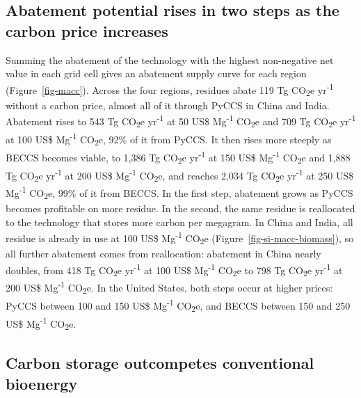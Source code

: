 \documentclass[
  letterpaper,
  twoside,
  twocolumn,
  9pt]{article}
\begin{document}
\subsection{Abatement potential rises in two steps as the carbon price
increases}\label{abatement-potential-rises-in-two-steps-as-the-carbon-price-increases}

Summing the abatement of the technology with the highest non-negative
net value in each grid cell gives an abatement supply curve for each
region (Figure~\ref{fig-macc}). Across the four regions, residues abate
119 Tg CO\textsubscript{2}e yr\textsuperscript{-1} without a carbon
price, almost all of it through PyCCS in China and India. Abatement
rises to 543 Tg CO\textsubscript{2}e yr\textsuperscript{-1} at 50 US\$
Mg\textsuperscript{-1} CO\textsubscript{2}e and 709 Tg
CO\textsubscript{2}e yr\textsuperscript{-1} at 100 US\$
Mg\textsuperscript{-1} CO\textsubscript{2}e, 92\% of it from PyCCS. It
then rises more steeply as BECCS becomes viable, to 1,386 Tg
CO\textsubscript{2}e yr\textsuperscript{-1} at 150 US\$
Mg\textsuperscript{-1} CO\textsubscript{2}e and 1,888 Tg
CO\textsubscript{2}e yr\textsuperscript{-1} at 200 US\$
Mg\textsuperscript{-1} CO\textsubscript{2}e, and reaches 2,034 Tg
CO\textsubscript{2}e yr\textsuperscript{-1} at 250 US\$
Mg\textsuperscript{-1} CO\textsubscript{2}e, 99\% of it from BECCS. In
the first step, abatement grows as PyCCS becomes profitable on more
residue. In the second, the same residue is reallocated to the
technology that stores more carbon per megagram. In China and India, all
residue is already in use at 100 US\$ Mg\textsuperscript{-1}
CO\textsubscript{2}e (Figure~\ref{fig-si-macc-biomass}), so all further
abatement comes from reallocation: abatement in China nearly doubles,
from 418 Tg CO\textsubscript{2}e yr\textsuperscript{-1} at 100 US\$
Mg\textsuperscript{-1} CO\textsubscript{2}e to 798 Tg
CO\textsubscript{2}e yr\textsuperscript{-1} at 200 US\$
Mg\textsuperscript{-1} CO\textsubscript{2}e. In the United States, both
steps occur at higher prices: PyCCS between 100 and 150 US\$
Mg\textsuperscript{-1} CO\textsubscript{2}e, and BECCS between 150 and
250 US\$ Mg\textsuperscript{-1} CO\textsubscript{2}e.

\subsection{Carbon storage outcompetes conventional
bioenergy}\label{carbon-storage-outcompetes-conventional-bioenergy}
\end{document}
